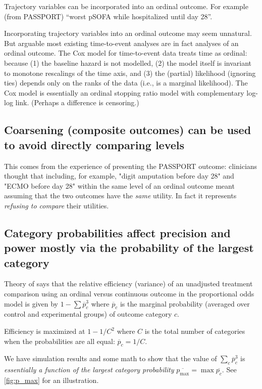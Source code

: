 \documentclass[
  11pt,
  fleqn
]{article}
\begin{document}
Trajectory variables can be incorporated into an ordinal outcome. For example
(from PASSPORT) ``worst pSOFA while hospitalized until day 28''.

Incorporating trajectory variables into an ordinal outcome may seem unnatural.
But arguable most existing time-to-event analyses are in fact analyses of an
ordinal outcome. The Cox model for time-to-event data treats time as ordinal:
because (1) the baseline hazard is not modelled, (2) the model itself is
invariant to monotone rescalings of the time axis, and (3) the (partial)
likelihood (ignoring ties) depends only on the ranks of the data (i.e., is a
marginal likelihood). The Cox model is essentially an ordinal
stopping ratio model with complementary log-log link. (Perhaps a
difference is censoring.)

\subsection{Coarsening (composite outcomes) can be used to avoid
directly comparing levels}

This comes from the experience of presenting the PASSPORT outcome:
clinicians thought that including, for example, "digit amputation
before day 28" and "ECMO before day 28" within the same level of an
ordinal outcome meant assuming that the two outcomes have the
\emph{same} utility. In fact it represents \emph{refusing to compare}
their utilities.

\subsection{Category probabilities affect precision and power mostly via the
probability of the largest category}

Theory of \citep{} says that the relative efficiency (variance) of an
unadjusted treatment comparison using an ordinal versus continuous outcome in
the proportional odds model is given by $1 - \sum \overline p_c^3$ where
$\overline p_c$ is the marginal probability (averaged over control and
experimental groups) of outcome category $c$.

Efficiency is maximized at $1 - 1/C^2$ where $C$ is the total number of
categories when the probabilities are all equal: $\overline p_c = 1/C$.

We have simulation results and some math to show that the value of $\sum_c
\overline p_c^3$ is \emph{essentially a function of the largest category
probability} $\overline{p_{\max}} = \max \overline{p_c}$. See \ref{fig:p_max}
for an illustration.
\end{document}
